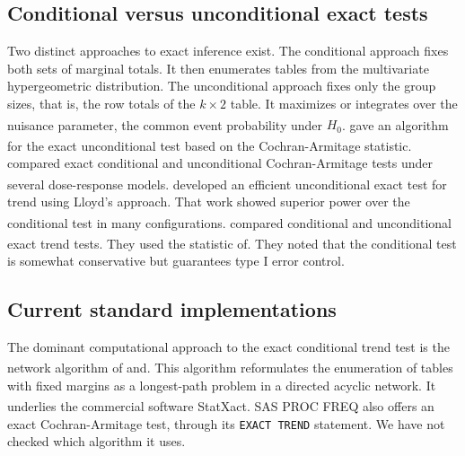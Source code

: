 \documentclass[
  11pt,
]{article}
\begin{document}
\subsection{Conditional versus unconditional exact tests}\label{conditional-versus-unconditional-exact-tests}

Two distinct approaches to exact inference exist. The
conditional approach fixes both sets of marginal totals.
It then enumerates tables from the multivariate
hypergeometric distribution. The unconditional approach
fixes only the group sizes, that is, the row totals of
the \(k \times 2\) table. It maximizes or integrates over
the nuisance parameter, the common event probability
under \(H_0\).\textsuperscript{} gave an algorithm for the
exact unconditional test based on the Cochran-Armitage
statistic.\textsuperscript{} compared exact conditional and
unconditional Cochran-Armitage tests under several
dose-response models.\textsuperscript{} developed an
efficient unconditional exact test for trend using
Lloyd's approach. That work showed superior power over
the conditional test in many configurations.\textsuperscript{} compared conditional and
unconditional exact trend tests. They used the statistic
of\textsuperscript{}. They noted that the conditional
test is somewhat conservative but guarantees type I error
control.

\subsection{Current standard implementations}\label{current-standard-implementations}

The dominant computational approach to the exact
conditional trend test is the network algorithm of\textsuperscript{} and\textsuperscript{}. This algorithm
reformulates the enumeration of tables with fixed margins
as a longest-path problem in a directed acyclic network.
It underlies the commercial software StatXact\textsuperscript{}. SAS PROC FREQ also offers an exact
Cochran-Armitage test, through its \texttt{EXACT\ TREND}
statement. We have not checked which algorithm it uses.
\end{document}

